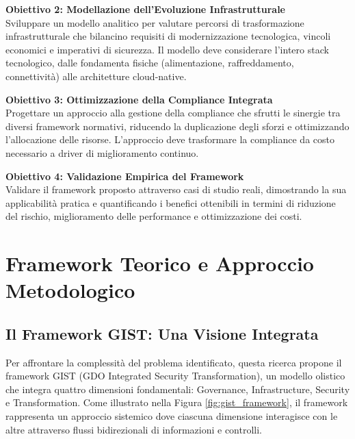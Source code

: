 \textbf{Obiettivo 2: Modellazione dell'Evoluzione Infrastrutturale}\\
Sviluppare un modello analitico per valutare percorsi di trasformazione infrastrutturale che bilancino requisiti di modernizzazione tecnologica, vincoli economici e imperativi di sicurezza. Il modello deve considerare l'intero stack tecnologico, dalle fondamenta fisiche (alimentazione, raffreddamento, connettività) alle architetture cloud-native.

\textbf{Obiettivo 3: Ottimizzazione della Compliance Integrata}\\
Progettare un approccio alla gestione della compliance che sfrutti le sinergie tra diversi framework normativi, riducendo la duplicazione degli sforzi e ottimizzando l'allocazione delle risorse. L'approccio deve trasformare la compliance da costo necessario a driver di miglioramento continuo.

\textbf{Obiettivo 4: Validazione Empirica del Framework}\\
Validare il framework proposto attraverso casi di studio reali, dimostrando la sua applicabilità pratica e quantificando i benefici ottenibili in termini di riduzione del rischio, miglioramento delle performance e ottimizzazione dei costi.

\section{Framework Teorico e Approccio Metodologico}

\subsection{Il Framework GIST: Una Visione Integrata}

Per affrontare la complessità del problema identificato, questa ricerca propone il framework GIST (GDO Integrated Security Transformation), un modello olistico che integra quattro dimensioni fondamentali: Governance, Infrastructure, Security e Transformation. Come illustrato nella Figura \ref{fig:gist_framework}, il framework rappresenta un approccio sistemico dove ciascuna dimensione interagisce con le altre attraverso flussi bidirezionali di informazioni e controlli.

